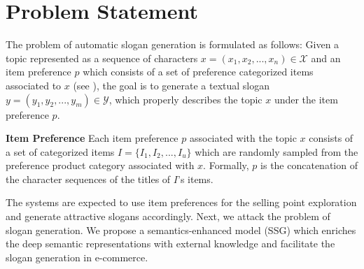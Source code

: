 \section{Problem Statement}
\label{sec:problem}
The problem of automatic slogan generation is formulated
as follows: Given a topic represented as a sequence of characters $x = (x_1, x_2, ..., x_n) \in \mathcal{X} $ and an item preference $p$ which consists of a set of preference categorized items associated to $x$ (see  ), the goal is to generate a textual slogan $y = (y_1, y_2, ..., y_m) \in \mathcal{Y}$, which properly describes the topic $x$ under the item preference $p$.



\theoremstyle{definition}
\begin{definition}
	\label{item_preference}
	\textbf{Item Preference}
	Each item preference $p$ associated with the topic $x$ consists of a set of categorized items 
	$I=\{I_1, I_2, ..., I_u\}$ which are randomly sampled from the preference product category associated with $x$.
	Formally, $p$ is the concatenation of the character sequences of the titles of $I$'s items.
\end{definition}

The systems are expected to use item preferences for the selling point exploration and generate attractive slogans accordingly.
Next, we attack the problem of slogan generation. 
We propose a semantics-enhanced model (SSG) which enriches the deep semantic representations with external knowledge and facilitate the slogan generation in e-commerce.


